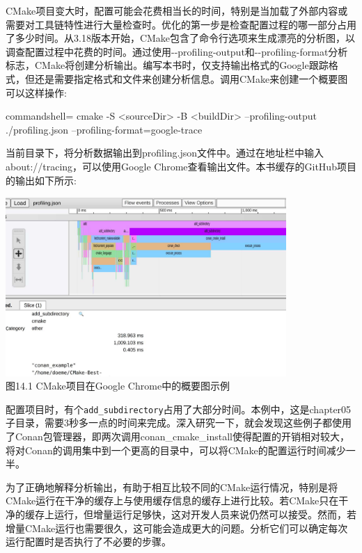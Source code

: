 CMake项目变大时，配置可能会花费相当长的时间，特别是当加载了外部内容或需要对工具链特性进行大量检查时。优化的第一步是检查配置过程的哪一部分占用了多少时间。从3.18版本开始，CMake包含了命令行选项来生成漂亮的分析图，以调查配置过程中花费的时间。通过使用-{}-profiling-output和-{}-profiling-format分析标志，CMake将创建分析输出。编写本书时，仅支持输出格式的Google跟踪格式，但还是需要指定格式和文件来创建分析信息。调用CMake来创建一个概要图可以这样操作:

\begin{tcblisting}{commandshell={}}
cmake -S <sourceDir> -B <buildDir> --profiling-output
  ./profiling.json --profiling-format=google-trace
\end{tcblisting}

当前目录下，将分析数据输出到profiling.json文件中。通过在地址栏中输入about://tracing，可以使用Google Chrome查看输出文件。本书缓存的GitHub项目的输出如下所示:

\begin{center}
\includegraphics[width=0.8\textwidth]{content/3/chapter14/images/1.jpg}\\
图14.1  CMake项目在Google Chrome中的概要图示例
\end{center}

配置项目时，有个\texttt{add\_subdirectory}占用了大部分时间。本例中，这是chapter05子目录，需要3秒多一点的时间来完成。深入研究一下，就会发现这些例子都使用了Conan包管理器，即两次调用conan\_cmake\_install使得配置的开销相对较大，将对Conan的调用集中到一个更高的目录中，可以将CMake的配置运行时间减少一半。

为了正确地解释分析输出，有助于相互比较不同的CMake运行情况，特别是将CMake运行在干净的缓存上与使用缓存信息的缓存上进行比较。若CMake只在干净的缓存上运行，但增量运行足够快，这对开发人员来说仍然可以接受。然而，若增量CMake运行也需要很久，这可能会造成更大的问题。分析它们可以确定每次运行配置时是否执行了不必要的步骤。


